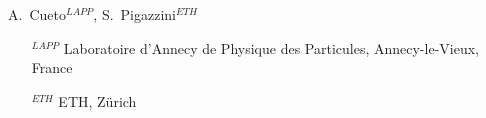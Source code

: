 \begin{flushleft}
  A.~Cueto$^{LAPP}$,
  S.~Pigazzini$^{ETH}$
\end{flushleft}

\begin{itemize}
\item[$^{LAPP}$] Laboratoire d'Annecy de Physique des Particules, Annecy-le-Vieux, France
\item[$^{ETH}$] ETH, Zürich
\end{itemize}



